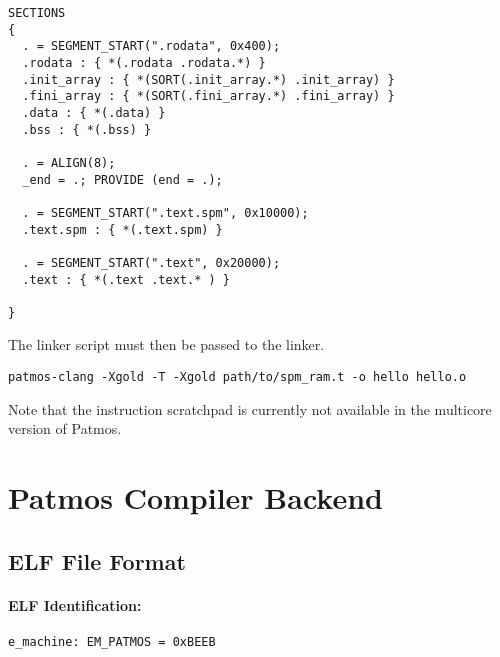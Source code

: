 \begin{verbatim}
SECTIONS
{
  . = SEGMENT_START(".rodata", 0x400);
  .rodata : { *(.rodata .rodata.*) }
  .init_array : { *(SORT(.init_array.*) .init_array) }
  .fini_array : { *(SORT(.fini_array.*) .fini_array) }
  .data : { *(.data) }
  .bss : { *(.bss) }

  . = ALIGN(8);
  _end = .; PROVIDE (end = .);

  . = SEGMENT_START(".text.spm", 0x10000);
  .text.spm : { *(.text.spm) }

  . = SEGMENT_START(".text", 0x20000);
  .text : { *(.text .text.* ) }

}
\end{verbatim}

The linker script must then be passed to the linker.

\begin{verbatim}
patmos-clang -Xgold -T -Xgold path/to/spm_ram.t -o hello hello.o
\end{verbatim}

Note that the instruction scratchpad is currently not available in the multicore version of Patmos.



%



\section{Patmos Compiler Backend}
\label{sec:toolchain:backend}

\subsection{ELF File Format}

\paragraph{ELF Identification:}

\begin{verbatim}
e_machine: EM_PATMOS = 0xBEEB
\end{verbatim}

